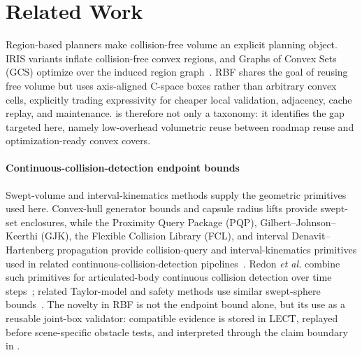 \documentclass[journal]{IEEEtran}
\DeclareRobustCommand{\textsc}[1]{\textnormal{\MakeUppercase{#1}}}
\newcommand{\rbf}{\textsc{RBF}}
\newcommand{\cspace}{\mbox{C-space}}
\newcommand{\etal}{\textit{et al.}}
\begin{document}
\section{Related Work}\label{sec:related}

Region-based planners make collision-free volume an explicit planning object.
IRIS variants inflate collision-free convex regions, and Graphs of Convex Sets
(GCS) optimize over the induced region graph~\cite{deits2015computing,
marcucci2023motion,marcucci2024shortest,amice2022finding,
petersen2023growing,werner2024approximating}. \rbf{} shares the goal of
reusing free volume but uses axis-aligned \cspace{} boxes rather than arbitrary
convex cells, explicitly trading expressivity for cheaper local validation,
adjacency, cache replay, and maintenance.  is therefore
not only a taxonomy: it identifies the gap targeted here, namely low-overhead
volumetric reuse between roadmap reuse and optimization-ready convex covers.

\paragraph{Continuous-collision-detection endpoint bounds}
\label{sec:related_endpoint_bounds}
Swept-volume and interval-kinematics methods supply the geometric primitives
used here. Convex-hull generator bounds and capsule radius lifts provide
swept-set enclosures, while the Proximity Query Package (PQP),
Gilbert--Johnson--Keerthi (GJK), the Flexible Collision Library (FCL), and
interval Denavit--Hartenberg propagation provide collision-query and
interval-kinematics primitives used in related continuous-collision-detection
pipelines~\cite{blackmore1992swept,abdel2006swept,
gottschalk1996obbtree,larsen1999fast,gilbert1988fast,bergen1999gjk,
pan2012fcl,moore2009introduction,jaulin2001applied,snyder1992interval,
merlet2004solving,merlet2009interval}. Redon \etal{} combine such primitives for
articulated-body continuous collision detection over time
steps~\cite{redon2004ccd_avatar,redon2005fast_artic}; related Taylor-model and
safety methods use similar swept-sphere
bounds~\cite{zhang2007taylor,schwarzer2005adaptive,corrales2011ssl}. The
novelty in \rbf{} is not the endpoint bound alone, but its use as a reusable
joint-box validator: compatible evidence is stored in LECT, replayed before
scene-specific obstacle tests, and interpreted through the claim boundary in
.
\end{document}
